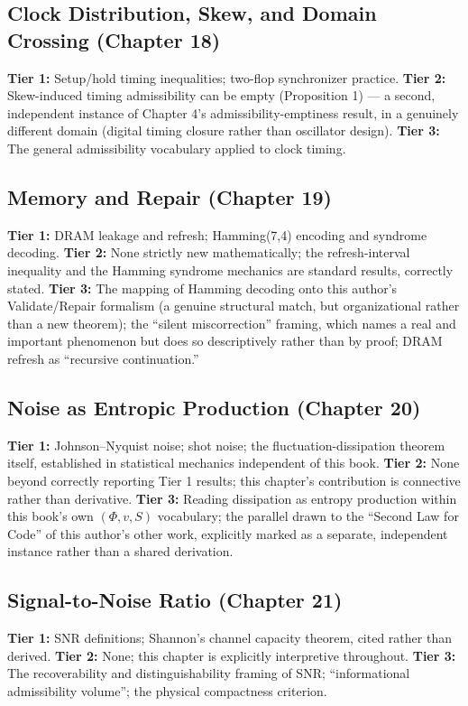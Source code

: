 \documentclass[12pt]{article}
\begin{document}
\subsection*{Clock Distribution, Skew, and Domain Crossing (Chapter 18)}
\textbf{Tier 1:} Setup/hold timing inequalities; two-flop synchronizer practice.
\textbf{Tier 2:} Skew-induced timing admissibility can be empty (Proposition 1) --- a second, independent instance of Chapter 4's admissibility-emptiness result, in a genuinely different domain (digital timing closure rather than oscillator design).
\textbf{Tier 3:} The general admissibility vocabulary applied to clock timing.

\subsection*{Memory and Repair (Chapter 19)}
\textbf{Tier 1:} DRAM leakage and refresh; Hamming(7,4) encoding and syndrome decoding.
\textbf{Tier 2:} None strictly new mathematically; the refresh-interval inequality and the Hamming syndrome mechanics are standard results, correctly stated.
\textbf{Tier 3:} The mapping of Hamming decoding onto this author's Validate/Repair formalism (a genuine structural match, but organizational rather than a new theorem); the ``silent miscorrection'' framing, which names a real and important phenomenon but does so descriptively rather than by proof; DRAM refresh as ``recursive continuation.''

\subsection*{Noise as Entropic Production (Chapter 20)}
\textbf{Tier 1:} Johnson--Nyquist noise; shot noise; the fluctuation-dissipation theorem itself, established in statistical mechanics independent of this book.
\textbf{Tier 2:} None beyond correctly reporting Tier 1 results; this chapter's contribution is connective rather than derivative.
\textbf{Tier 3:} Reading dissipation as entropy production within this book's own $(\Phi, v, S)$ vocabulary; the parallel drawn to the ``Second Law for Code'' of this author's other work, explicitly marked as a separate, independent instance rather than a shared derivation.

\subsection*{Signal-to-Noise Ratio (Chapter 21)}
\textbf{Tier 1:} SNR definitions; Shannon's channel capacity theorem, cited rather than derived.
\textbf{Tier 2:} None; this chapter is explicitly interpretive throughout.
\textbf{Tier 3:} The recoverability and distinguishability framing of SNR; ``informational admissibility volume''; the physical compactness criterion.
\end{document}
